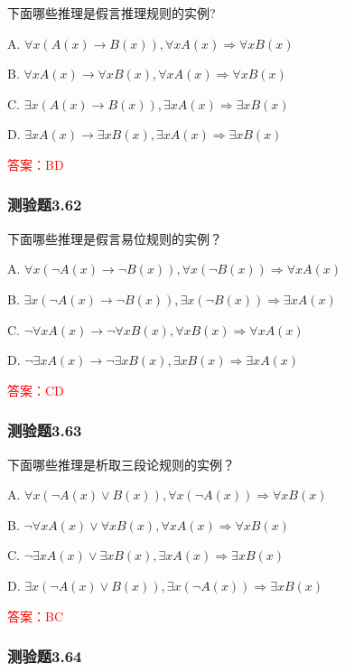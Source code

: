 \documentclass[UTF8, heading=true]{ctexart}
\begin{document}
下面哪些推理是假言推理规则的实例?

A. $\forall x(A(x) \rightarrow B(x)),  \forall x A(x) \Longrightarrow \forall x B(x)$

B. $\forall x A(x) \rightarrow \forall x B(x), \forall x A(x) \Longrightarrow \forall x B(x)$

C. $\exists x(A(x) \rightarrow B(x)),  \exists x A(x) \Longrightarrow \exists x B(x)$

D. $\exists x A(x) \rightarrow \exists x B(x), \exists x A(x) \Longrightarrow \exists x B(x)$

\textcolor{red}{答案：BD}


\subsubsection{测验题3.62}

下面哪些推理是假言易位规则的实例？

A. $\forall x(\neg A(x) \rightarrow \neg B(x)),  \forall x(\neg B(x)) \Longrightarrow \forall x A(x)$

B. $\exists x(\neg A(x) \rightarrow \neg B(x)),  \exists x(\neg B(x)) \Longrightarrow \exists x A(x)$

C. $\neg \forall x A(x) \rightarrow \neg \forall x B(x), \forall x B(x) \Longrightarrow \forall x A(x)$

D. $\neg \exists x A(x) \rightarrow \neg \exists x B(x),  \exists x B(x) \Longrightarrow \exists x A(x)$

\textcolor{red}{答案：CD}

\subsubsection{测验题3.63}

下面哪些推理是析取三段论规则的实例？

A. $\forall x(\neg A(x) \vee B(x)),  \forall x(\neg A(x)) \Longrightarrow \forall x B(x)$

B. $\neg \forall x A(x) \vee \forall x B(x),  \forall x A(x) \Longrightarrow \forall x B(x)$

C. $\neg \exists x A(x) \vee \exists x B(x), \exists x A(x) \Longrightarrow \exists x B(x)$

D. ${\exists x}(\neg A(x) \vee B(x)),  \exists x(\neg A(x)) \Longrightarrow \exists x B(x)$


\textcolor{red}{答案：BC}

\subsubsection{测验题3.64}
\end{document}
